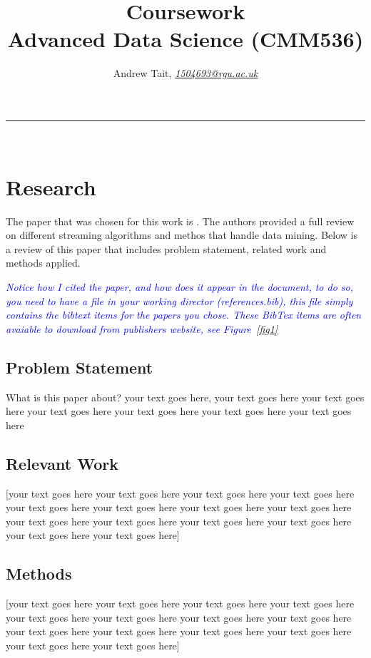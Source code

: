 \documentclass[10pt  ,usenames, dvipsnames]{article}\usepackage[]{graphicx}\usepackage[]{color}
\begin{document}
\title{\LARGE Coursework  \\ Advanced Data Science (CMM536)}

\author{Andrew Tait, \textit{\href{1504693@rgu.ac.uk}{1504693@rgu.ac.uk}}}
\maketitle
\noindent\rule{16cm}{0.4pt}
\ \\

\section{Research}


The paper that was chosen for this work is \cite{PHRIDVIRAJ2014255}. The authors provided a full review on different streaming algorithms and methos that handle data mining. Below is a review of this paper that includes problem statement, related work and methods applied.

\textcolor{blue}{\textit{Notice how I cited the paper, and how does it appear in the document, to do so, you need to have a file in your working director (references.bib), this file simply contains the bibtext items for the papers you chose. These BibTex items are often avaiable to download from publishers website, see Figure~\ref{fig1}}}
\subsection{Problem Statement}
What is this paper about? your text goes here, your text goes here your text goes here your text goes here your text goes here your text goes here your text goes here

\subsection{Relevant Work}
[your text goes here your text goes here your text goes here your text goes here your text goes here your text goes here your text goes here your text goes here your text goes here your text goes here your text goes here your text goes here your text goes here your text goes here]
\subsection{Methods}
[your text goes here your text goes here your text goes here your text goes here your text goes here your text goes here your text goes here your text goes here your text goes here your text goes here your text goes here your text goes here your text goes here your text goes here]
\end{document}
